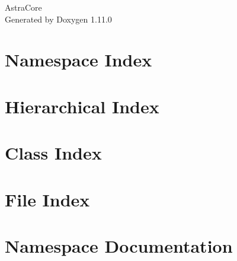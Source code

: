 \documentclass[twoside]{book}
\newcommand{\+}{\discretionary{\mbox{\scriptsize$\hookleftarrow$}}{}{}}
\newcommand{\clearemptydoublepage}{%
    \newpage{\pagestyle{empty}\cleardoublepage}%
  }
\begin{document}
  \raggedbottom
    \hypersetup{pageanchor=false,
                bookmarksnumbered=true,
                pdfencoding=unicode
               }
  \begin{titlepage}
  \vspace*{7cm}
  \begin{center}%
  {\Large Astra\+Core}\\
  \vspace*{1cm}
  {\large Generated by Doxygen 1.11.0}\\
  \end{center}
  \end{titlepage}
  \clearemptydoublepage
  \tableofcontents
  \clearemptydoublepage
  \hypersetup{pageanchor=true}
\chapter{Namespace Index}

\chapter{Hierarchical Index}

\chapter{Class Index}

\chapter{File Index}

\chapter{Namespace Documentation}

\end{document}
